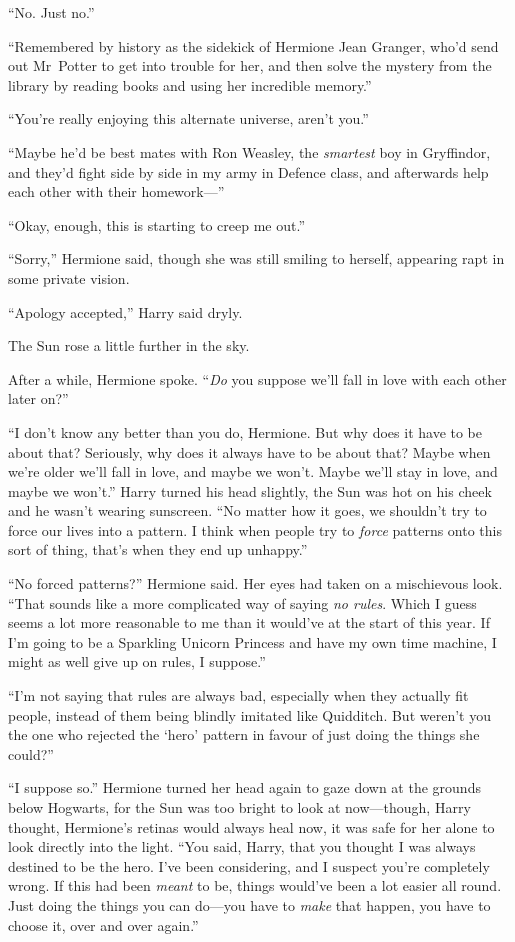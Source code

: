 “No. Just no.”

“Remembered by history as the sidekick of Hermione Jean Granger, who’d send out Mr~Potter to get into trouble for her, and then solve the mystery from the library by reading books and using her incredible memory.”

“You’re really enjoying this alternate universe, aren’t you.”

“Maybe he’d be best mates with Ron Weasley, the \emph{smartest} boy in Gryffindor, and they’d fight side by side in my army in Defence class, and afterwards help each other with their homework—”

“Okay, enough, this is starting to creep me out.”

“Sorry,” Hermione said, though she was still smiling to herself, appearing rapt in some private vision.

“Apology accepted,” Harry said dryly.

The Sun rose a little further in the sky.

After a while, Hermione spoke. “\emph{Do} you suppose we’ll fall in love with each other later on?”

“I don’t know any better than you do, Hermione. But why does it have to be about that? Seriously, why does it always have to be about that? Maybe when we’re older we’ll fall in love, and maybe we won’t. Maybe we’ll stay in love, and maybe we won’t.” Harry turned his head slightly, the Sun was hot on his cheek and he wasn’t wearing sunscreen. “No matter how it goes, we shouldn’t try to force our lives into a pattern. I think when people try to \emph{force} patterns onto this sort of thing, that’s when they end up unhappy.”

“No forced patterns?” Hermione said. Her eyes had taken on a mischievous look. “That sounds like a more complicated way of saying \emph{no rules}. Which I guess seems a lot more reasonable to me than it would’ve at the start of this year. If I’m going to be a Sparkling Unicorn Princess and have my own time machine, I might as well give up on rules, I suppose.”

“I’m not saying that rules are always bad, especially when they actually fit people, instead of them being blindly imitated like Quidditch. But weren’t you the one who rejected the ‘hero’ pattern in favour of just doing the things she could?”

“I suppose so.” Hermione turned her head again to gaze down at the grounds below Hogwarts, for the Sun was too bright to look at now—though, Harry thought, Hermione’s retinas would always heal now, it was safe for her alone to look directly into the light. “You said, Harry, that you thought I was always destined to be the hero. I’ve been considering, and I suspect you’re completely wrong. If this had been \emph{meant} to be, things would’ve been a lot easier all round. Just doing the things you can do—you have to \emph{make} that happen, you have to choose it, over and over again.”

